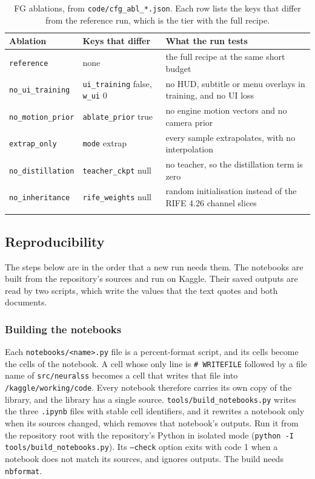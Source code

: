 \begin{table}[!htbp]
\caption{FG ablations, from \texttt{code/cfg\_abl\_*.json}. Each row lists the keys that differ from the reference run, which is the  tier with the full recipe.}\label{tab:app-fg-abl}
\footnotesize
\begin{tabular*}{\textwidth}{@{\extracolsep\fill}lp{}p{}}
\toprule
Ablation & Keys that differ & What the run tests \\
\midrule
\texttt{reference} & none & the full recipe at the same short budget \\
\texttt{no\_ui\_training} & \texttt{ui\_training} false, \texttt{w\_ui} 0 & no HUD, subtitle or menu overlays in training, and no UI loss \\
\texttt{no\_motion\_prior} & \texttt{ablate\_prior} true & no engine motion vectors and no camera prior \\
\texttt{extrap\_only} & \texttt{mode} extrap & every sample extrapolates, with no interpolation \\
\texttt{no\_distillation} & \texttt{teacher\_ckpt} null & no teacher, so the distillation term is zero \\
\texttt{no\_inheritance} & \texttt{rife\_weights} null & random initialisation instead of the RIFE 4.26 channel slices \\
\botrule
\end{tabular*}
\end{table}

\subsection{Reproducibility}\label{sec:app-repro}

The steps below are in the order that a new run needs them. The notebooks are built from the repository's sources and run on Kaggle. Their saved outputs are read by two scripts, which write the values that the text quotes and both documents.

\subsubsection{Building the notebooks}\label{sec:app-build}

Each \texttt{notebooks/<name>.py} file is a percent-format script, and its cells become the cells of the notebook. A cell whose only line is \texttt{\# WRITEFILE} followed by a file name of \texttt{src/neuralss} becomes a cell that writes that file into \texttt{/kaggle/working/code}. Every notebook therefore carries its own copy of the library, and the library has a single source. \texttt{tools/build\_notebooks.py} writes the three \texttt{.ipynb} files with stable cell identifiers, and it rewrites a notebook only when its sources changed, which removes that notebook's outputs. Run it from the repository root with the repository's Python in isolated mode (\texttt{python -I tools/build\_notebooks.py}). Its \texttt{--check} option exits with code 1 when a notebook does not match its sources, and ignores outputs. The build needs \texttt{nbformat}.

